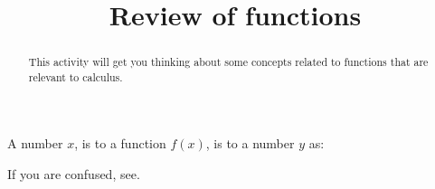 \documentclass{ximera}
\title{Review of functions}
\begin{document}
\begin{abstract}
  This activity will get you thinking about some concepts related to
  functions that are relevant to calculus.
\end{abstract}
\maketitle


\begin{question}
  A number $x$, is to a function $f(x)$, is to a number $y$ as:
  \begin{solution}
    \begin{hint}
      If you are confused, see.
    \end{hint}
    \begin{multiple-choice}
    \end{multiple-choice}
  \end{solution}
\end{question}
\end{document}
